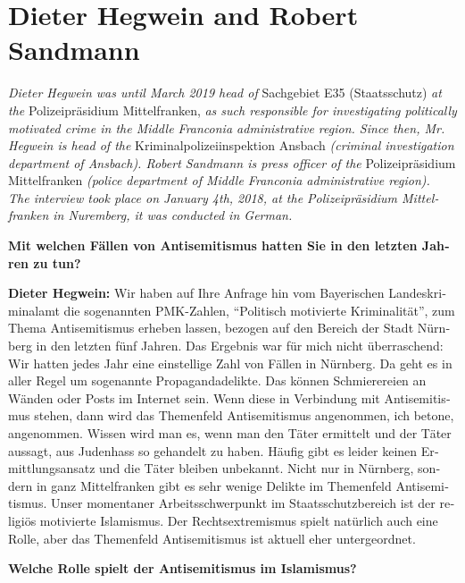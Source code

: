 \section{Dieter Hegwein and Robert Sandmann}
\begin{otherlanguage}{ngerman}
\textit{Dieter Hegwein was until March 2019 head of} Sachgebiet E35 (Staatsschutz) \textit{at the} Polizeipräsidium Mittelfranken, \textit{as such responsible for investigating politically motivated crime in the Middle Franconia administrative region. Since then, Mr. Hegwein is head of the} Kriminalpolizeiinspektion Ansbach \textit{(criminal investigation department of Ansbach). Robert Sandmann is press officer of the} Polizeipräsidium Mittelfranken \textit{(police department of Middle Franconia administrative region).\\
The interview took place on January 4th, 2018, at the Polizeipräsidium Mittelfranken in Nuremberg, it was conducted in German.}\par 
\vspace*{2em}
\textbf{Mit welchen Fällen von Antisemitismus hatten Sie in den letzten Jahren zu tun?}

\textbf{Dieter Hegwein:} Wir haben auf Ihre Anfrage hin vom Bayerischen Landeskriminalamt die sogenannten PMK-Zahlen, "`Politisch motivierte Kriminalität"', zum Thema Antisemitismus erheben lassen, bezogen auf den Bereich der Stadt Nürnberg in den letzten fünf Jahren. Das Ergebnis war für mich nicht überraschend: Wir hatten jedes Jahr eine einstellige Zahl von Fällen in Nürnberg. Da geht es in aller Regel um sogenannte Propagandadelikte. Das können Schmierereien an Wänden oder Posts im Internet sein. Wenn diese in Verbindung mit Antisemitismus stehen, dann wird das Themenfeld Antisemitismus angenommen, ich betone, angenommen. Wissen wird man es, wenn man den Täter ermittelt und der Täter aussagt, aus Judenhass so gehandelt zu haben. Häufig gibt es leider keinen Ermittlungsansatz und die Täter bleiben unbekannt. Nicht nur in Nürnberg, sondern in ganz Mittelfranken gibt es sehr wenige Delikte im Themenfeld Antisemitismus. Unser momentaner Arbeitsschwerpunkt im Staatsschutzbereich ist der religiös motivierte Islamismus. Der Rechtsextremismus spielt natürlich auch eine Rolle, aber das Themenfeld Antisemitismus ist aktuell eher untergeordnet. 

\textbf{Welche Rolle spielt der Antisemitismus im Islamismus?}


\end{otherlanguage}

